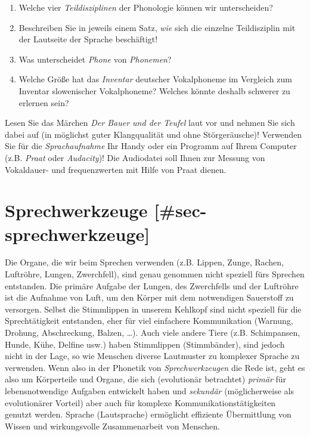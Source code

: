 \documentclass[
  letterpaper,
]{scrbook}
\providecommand{\tightlist}{%
  \setlength{\itemsep}{0pt}\setlength{\parskip}{0pt}}\usepackage{longtable,booktabs,array}
\begin{document}
\begin{enumerate}
\def\labelenumi{\arabic{enumi}.}
\tightlist
\item
  Welche vier \emph{Teildisziplinen} der Phonologie können wir
  unterscheiden?\\
\item
  Beschreiben Sie in jeweils einem Satz, \emph{wie} sich die einzelne
  Teildisziplin mit der Lautseite der Sprache beschäftigt!\\
\item
  Was unterscheidet \emph{Phone} von \emph{Phonemen}?\\
\item
  Welche Größe hat das \emph{Inventar} deutscher Vokalphoneme im
  Vergleich zum Inventar slowenischer Vokalphoneme? Welches könnte
  deshalb schwerer zu erlernen sein?\\
\end{enumerate}

Lesen Sie das Märchen \emph{Der Bauer und der Teufel} laut vor und
nehmen Sie sich dabei auf (in möglichst guter Klangqualität und ohne
Störgeräusche)! Verwenden Sie für die \emph{Sprachaufnahme} Ihr Handy
oder ein Programm auf Ihrem Computer (z.B. \emph{Praat} oder
\emph{Audacity})! Die Audiodatei soll Ihnen zur Messung von Vokaldauer-
und frequenzwerten mit Hilfe von Praat dienen.

\hypertarget{sprechwerkzeuge-sec-sprechwerkzeuge}{%
\section{Sprechwerkzeuge
{[}\#sec-sprechwerkzeuge{]}}\label{sprechwerkzeuge-sec-sprechwerkzeuge}}

Die Organe, die wir beim Sprechen verwenden (z.B. Lippen, Zunge, Rachen,
Luftröhre, Lungen, Zwerchfell), sind genau genommen nicht speziell fürs
Sprechen entstanden. Die primäre Aufgabe der Lungen, des Zwerchfells und
der Luftröhre ist die Aufnahme von Luft, um den Körper mit dem
notwendigen Sauerstoff zu versorgen. Selbst die Stimmlippen in unserem
Kehlkopf sind nicht speziell für die Sprechtätigkeit entstanden, eher
für viel einfachere Kommunikation (Warnung, Drohung, Abschreckung,
Balzen, \ldots). Auch viele andere Tiere (z.B. Schimpansen, Hunde, Kühe,
Delfine usw.) haben Stimmlippen (Stimmbänder), sind jedoch nicht in der
Lage, so wie Menschen diverse Lautmuster zu komplexer Sprache zu
verwenden. Wenn also in der Phonetik von \emph{Sprechwerkzeugen} die
Rede ist, geht es also um Körperteile und Organe, die sich (evolutionär
betrachtet) \emph{primär} für lebensnotwendige Aufgaben entwickelt haben
und \emph{sekundär} (möglicherweise als evolutionärer Vorteil) aber auch
für komplexe Kommunikationstätigkeiten genutzt werden. Sprache
(Lautsprache) ermöglicht effiziente Übermittlung von Wissen und
wirkungsvolle Zusammenarbeit von Menschen.
\end{document}
